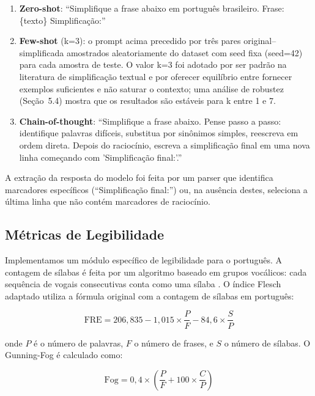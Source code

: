 \documentclass[a4paper, twocolumn, 11pt, twoside]{article}
\begin{document}
\begin{enumerate}
    \item \textbf{Zero-shot}: ``Simplifique a frase abaixo em português
        brasileiro. Frase: \{texto\} Simplificação:''
    \item \textbf{Few-shot} (k=3): o prompt acima precedido por três
        pares original--simplificada amostrados aleatoriamente do
        dataset com seed fixa (seed=42) para cada amostra de teste.
        O valor k=3 foi adotado por ser padrão na literatura
        de simplificação textual \citep{brown2020} e por oferecer
        equilíbrio entre fornecer exemplos suficientes e não
        saturar o contexto; uma análise de robustez (Seção~5.4)
        mostra que os resultados são estáveis para
        k entre 1 e 7.
    \item \textbf{Chain-of-thought}: ``Simplifique a frase abaixo. Pense
        passo a passo: identifique palavras difíceis, substitua por
        sinônimos simples, reescreva em ordem direta. Depois do
        raciocínio, escreva a simplificação final em uma nova linha
        começando com 'Simplificação final:'.''
\end{enumerate}

A extração da resposta do modelo foi feita por um parser que identifica
marcadores específicos (``Simplificação final:'') ou, na ausência
destes, seleciona a última linha que não contém marcadores de
raciocínio.

\subsection{Métricas de Legibilidade}

Implementamos um módulo específico de legibilidade para o português. A
contagem de sílabas é feita por um algoritmo baseado em grupos
vocálicos: cada sequência de vogais consecutivas conta como uma
sílaba \citep{aluisio2008}. O índice Flesch adaptado utiliza a fórmula original com a
contagem de sílabas em português:

\begin{equation}
    \text{FRE} = 206,835 - 1,015 \times \frac{P}{F} - 84,6 \times \frac{S}{P}
\end{equation}

onde $P$ é o número de palavras, $F$ o número de frases, e $S$ o
número de sílabas. O Gunning-Fog é calculado como:

\begin{equation}
    \text{Fog} = 0,4 \times \left(\frac{P}{F} + 100 \times \frac{C}{P}\right)
\end{equation}
\end{document}
